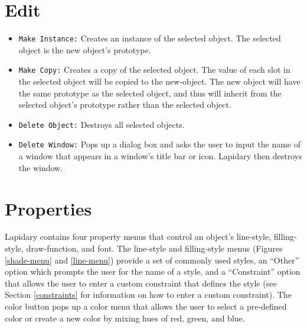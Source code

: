 \section{Edit}
\label{edit-commands}
\begin{itemize}
\item {}
{\tt Make Instance:} Creates an instance of the selected object.  The selected
object is the new object's prototype.

\item {}
{\tt Make Copy:} Creates a copy of the selected object.  The value of each
slot in the selected object will be copied to the new-object.
The new object will have the same prototype as the selected object,
and thus will inherit from the selected object's prototype rather
than the selected object.

\item {}
{\tt Delete Object:} Destroys all selected objects.

\item {}
{\tt Delete Window:} Pops up a dialog box and asks the user to input
the name of a window that appears in a window's title bar or icon.
Lapidary then destroys the window.

\end{itemize}


\section{Properties}
\label{Properties}

Lapidary contains four property menus that control an object's line-style,
filling-style, draw-function, and font.
The line-style and filling-style menus (Figures \ref{shade-menu} and
\ref{line-menu}) provide a set of commonly used
styles, an ``Other'' option which prompts the user for the name of a style,
and a ``Constraint'' option that allows the user to enter a custom constraint
that defines the style (see Section \ref{constraints} for information
on how to enter a custom constraint).
The color button pops up a color menu that allows the user to select a
pre-defined color or create a new color by mixing hues of red, green,
and blue.

